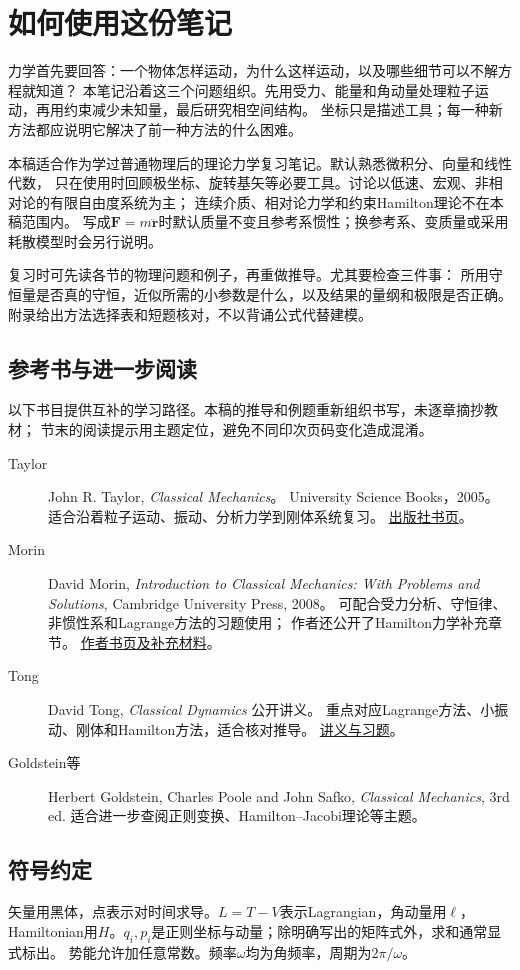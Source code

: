 \chapter*{如何使用这份笔记}

力学首先要回答：一个物体怎样运动，为什么这样运动，以及哪些细节可以不解方程就知道？
本笔记沿着这三个问题组织。先用受力、能量和角动量处理粒子运动，再用约束减少未知量，最后研究相空间结构。
坐标只是描述工具；每一种新方法都应说明它解决了前一种方法的什么困难。

本稿适合作为学过普通物理后的理论力学复习笔记。默认熟悉微积分、向量和线性代数，
只在使用时回顾极坐标、旋转基矢等必要工具。讨论以低速、宏观、非相对论的有限自由度系统为主；
连续介质、相对论力学和约束Hamilton理论不在本稿范围内。
写成$\bm F=m\ddot{\bm r}$时默认质量不变且参考系惯性；换参考系、变质量或采用耗散模型时会另行说明。

复习时可先读各节的物理问题和例子，再重做推导。尤其要检查三件事：
所用守恒量是否真的守恒，近似所需的小参数是什么，以及结果的量纲和极限是否正确。
附录给出方法选择表和短题核对，不以背诵公式代替建模。

\section*{参考书与进一步阅读}
以下书目提供互补的学习路径。本稿的推导和例题重新组织书写，未逐章摘抄教材；
节末的阅读提示用主题定位，避免不同印次页码变化造成混淆。
\begin{description}
  \item[Taylor]
  John R. Taylor, \emph{Classical Mechanics}。
  University Science Books，2005。
  适合沿着粒子运动、振动、分析力学到刚体系统复习。
  \href{https://uscibooks.aip.org/books/classical-mechanics/}{出版社书页}。
  \item[Morin]
  David Morin, \emph{Introduction to Classical Mechanics: With Problems and Solutions},
  Cambridge University Press, 2008。
  可配合受力分析、守恒律、非惯性系和Lagrange方法的习题使用；
  作者还公开了Hamilton力学补充章节。
  \href{https://davidmorin.physics.fas.harvard.edu/books/classical-mechanics}{作者书页及补充材料}。
  \item[Tong]
  David Tong, \emph{Classical Dynamics} 公开讲义。
  重点对应Lagrange方法、小振动、刚体和Hamilton方法，适合核对推导。
  \href{https://davidtong.org/teaching/classical-dynamics/}{讲义与习题}。
  \item[Goldstein等]
  Herbert Goldstein, Charles Poole and John Safko, \emph{Classical Mechanics}, 3rd ed.
  适合进一步查阅正则变换、Hamilton--Jacobi理论等主题。
\end{description}

\section*{符号约定}
矢量用黑体，点表示对时间求导。$L=T-V$表示Lagrangian，角动量用$\bm\ell$，
Hamiltonian用$H$。$q_i,p_i$是正则坐标与动量；除明确写出的矩阵式外，求和通常显式标出。
势能允许加任意常数。频率$\omega$均为角频率，周期为$2\pi/\omega$。
